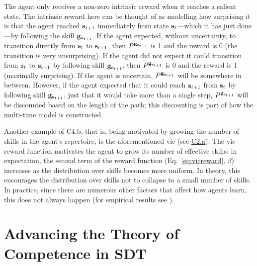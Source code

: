 \documentclass[10pt,letterpaper]{article}
\begin{document}
The agent only receives a non-zero intrinsic reward when it reaches a salient state. The intrinsic reward here can be thought of as modelling how surprising it is that the agent reached ${\mathbf{s}}_{t+1}$ immediately from state ${\mathbf{s}}_t$---which it has just done---by following the skill ${\mathbf{g}}_{{\mathbf{s}}_{t+1}}$. If the agent expected, without uncertainty, to transition directly from ${\mathbf{s}}_t$ to ${\mathbf{s}}_{t+1}$, then $P^{{\mathbf{g}}_{{\mathbf{s}}_{t+1}}}$ is 1 and the reward is 0 (the transition is very unsurprising). If the agent did not expect it could transition from ${\mathbf{s}}_t$ to ${\mathbf{s}}_{t+1}$ by following skill ${\mathbf{g}}_{{\mathbf{s}}_{t+1}}$, then $P^{{\mathbf{g}}_{{\mathbf{s}}_{t+1}}}$ is 0 and the reward is 1 (maximally surprising). If the agent is uncertain, $P^{{\mathbf{g}}_{{\mathbf{s}}_{t+1}}}$ will be somewhere in between. However, if the agent expected that it could reach ${\mathbf{s}}_{t+1}$ from ${\mathbf{s}}_t$ by following skill ${\mathbf{g}}_{{\mathbf{s}}_{t+1}}$, just that it would take more than a single step, $P^{{\mathbf{g}}_{{\mathbf{s}}_{t+1}}}$ will be discounted based on the length of the path; this discounting is part of how the multi-time model is constructed.

Another example of C4.b, that is, being motivated by growing the number of skills in the agent's repertoire, is the aforementioned \gls{vic} (see \hyperref[sec:c2a]{C2.a}). The \gls{vic} reward function motivates the agent to grow its number of effective skills: in expectation, the second term of the reward function (Eq.~\ref{eq:vicreward}, $\beta$) increases as the distribution over skills becomes more uniform. In theory, this encourages the distribution over skills not to collapse to a small number of skills. In practice, since there are numerous other factors that affect how agents learn, this does not always happen (for empirical results see \citealp[Appendix E, pp.~17--18]{eysenbach2019diversity}).


\section{Advancing the Theory of Competence in SDT}
\end{document}
